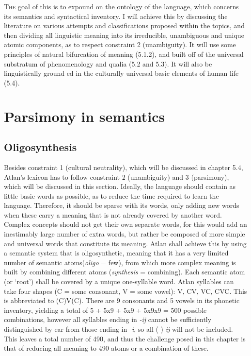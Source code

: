 
\lettrine{T}{he} goal of this is to expound  on the ontology of the language, which concerns its semantics and syntactical inventory. I will achieve this by discussing the literature on various attempts and classifications proposed within the topics, and then dividing all linguistic meaning into its irreducible, unambiguous and unique atomic components, as to respect constraint 2 (unambiguity). It will use some principles of natural bifurcation of meaning (5.1.2), and built off of the universal substratum of phenomenology and qualia (5.2 and 5.3). It will also be linguistically ground ed in the culturally universal basic elements of human life (5.4).


\section{Parsimony in semantics}

\subsection{Oligosynthesis}


Besides constraint 1 (cultural neutrality), which will be discussed in chapter 5.4, Atlan’s lexicon has to follow constraint 2 (unambiguity) and 3 (parsimony), which will be discussed in this section. Ideally, the language should contain as little basic words as possible, as to reduce the time required to learn the language. Therefore, it should be sparse with its words, only adding new words when these carry a meaning that is not already covered by another word. Complex concepts should not get their own separate words, for this would add an inestimably large number of extra words, but rather be composed of more simple and universal words that constitute its meaning. Atlan shall achieve this by using a semantic system that is oligosynthetic, meaning that it has a very limited number of semantic atoms\footnotemark (\textit{oligo}  = few), from which more complex meaning is built by combining different atoms (\textit{synthesis}  = combining). Each semantic atom (or ‘root’) shall be covered by a unique one-syllable word. Atlan syllables can take four shapes (C = some consonant, V = some vowel): V, CV, VC, CVC. This is abbreviated to (C)V(C). There are 9 consonants and 5 vowels in its phonetic inventory, yielding a total of 5 + 5x9 + 5x9 + 5x9x9 = 500 possible combinations, however all syllables ending in \textit{-ij} cannot be sufficiently distinguished by ear from those ending in \textit{-i}, so all (-) \textit{ij} will not be included. This leaves a total number of 490, and thus the challenge posed in this chapter is that of reducing all meaning to 490 atoms or a combination of these.  


